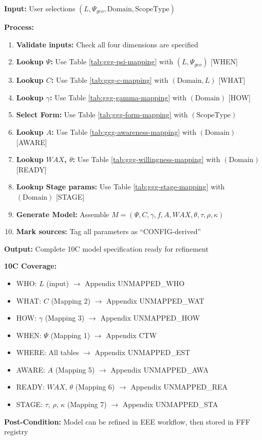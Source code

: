 \begin{tcolorbox}[colback=gray!5!white, colframe=gray!75!black,
    title=Algorithm CONFIG-1: Model Generation (10C Complete)]
\textbf{Input:} User selections $(L, \Psi_{geo}, \text{Domain}, \text{ScopeType})$

\textbf{Process:}
\begin{enumerate}
\item \textbf{Validate inputs:} Check all four dimensions are specified
\item \textbf{Lookup $\Psi$:} Use Table \ref{tab:ggg-psi-mapping} with $(L, \Psi_{geo})$ \hfill [WHEN]
\item \textbf{Lookup $C$:} Use Table \ref{tab:ggg-c-mapping} with $(\text{Domain}, L)$ \hfill [WHAT]
\item \textbf{Lookup $\gamma$:} Use Table \ref{tab:ggg-gamma-mapping} with $(\text{Domain})$ \hfill [HOW]
\item \textbf{Select Form:} Use Table \ref{tab:ggg-form-mapping} with $(\text{ScopeType})$
\item \textbf{Lookup $A$:} Use Table \ref{tab:ggg-awareness-mapping} with $(\text{Domain})$ \hfill [AWARE]
\item \textbf{Lookup $WAX$, $\theta$:} Use Table \ref{tab:ggg-willingness-mapping} with $(\text{Domain})$ \hfill [READY]
\item \textbf{Lookup Stage params:} Use Table \ref{tab:ggg-stage-mapping} with $(\text{Domain})$ \hfill [STAGE]
\item \textbf{Generate Model:} Assemble $M = (\Psi, C, \gamma, f, A, WAX, \theta, \tau, \rho, \kappa)$
\item \textbf{Mark sources:} Tag all parameters as ``CONFIG-derived''
\end{enumerate}

\textbf{Output:} Complete 10C model specification ready for refinement

\textbf{10C Coverage:}
\begin{itemize}[nosep]
\item WHO: $L$ (input) $\rightarrow$ Appendix UNMAPPED_WHO
\item WHAT: $C$ (Mapping 2) $\rightarrow$ Appendix UNMAPPED_WAT
\item HOW: $\gamma$ (Mapping 3) $\rightarrow$ Appendix UNMAPPED_HOW
\item WHEN: $\Psi$ (Mapping 1) $\rightarrow$ Appendix CTW
\item WHERE: All tables $\rightarrow$ Appendix UNMAPPED_EST
\item AWARE: $A$ (Mapping 5) $\rightarrow$ Appendix UNMAPPED_AWA
\item READY: $WAX$, $\theta$ (Mapping 6) $\rightarrow$ Appendix UNMAPPED_REA
\item STAGE: $\tau$, $\rho$, $\kappa$ (Mapping 7) $\rightarrow$ Appendix UNMAPPED_STA
\end{itemize}

\textbf{Post-Condition:} Model can be refined in EEE workflow, then stored in FFF registry
\end{tcolorbox}

